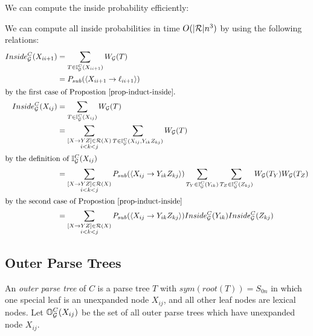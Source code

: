 \documentclass{article}
\newcommand\Inner{\mathbb{I}}
\newcommand\Outer{\mathbb{O}}
\begin{document}
We can compute the inside probability efficiently:

\begin{obs}
We can compute all inside probabilities in time $O(|{\mathcal R}|n^3)$ by using the
following relations:
  \begin{align*}
Inside_\GGG^C(X_{i i+1}) &= \sum_{T\in \Inner_\GGG^C(X_{i i+1})}
W_\GGG(T)\\
 &= P_{sub}(\langle X_{i i+1} \to \ell_{i i+1} \rangle) \\
\intertext{by the first case of Propostion \ref{prop-induct-inside}.}
Inside_\GGG^C(X_{ij}) &= \sum_{T\in \Inner_\GGG^C(X_{ij})} W_\GGG(T)\\
&= \sum_{\substack{[X\to YZ] \in \RRR(X)\\ i < k < j}} \sum_{T\in
  \Inner_\GGG^C(X_{ij}, Y_{ik}Z_{kj})} W_\GGG(T)\\
\intertext{by the definition of $\Inner_\GGG^C(X_{ij})$}
&= \sum_{\substack{[X\to YZ] \in \RRR(X)\\ i < k < j}} 
P_{sub}(\langle X_{ij} \to Y_{ik} Z_{kj} \rangle)
\sum_{T_Y\in \Inner_\GGG^C(Y_{ik})}
\sum_{T_Z\in \Inner_\GGG^C(Z_{kj})}
 W_\GGG(T_Y) W_\GGG(T_Z)\\
\intertext{by the second case of Propostion \ref{prop-induct-inside}}
&= \sum_{\substack{[X\to YZ] \in \RRR(X)\\ i < k < j}} 
P_{sub}(\langle  X_{ij} \to Y_{ik} Z_{kj} \rangle)
Inside_\GGG^C(Y_{ik})
Inside_\GGG^C(Z_{kj})
  \end{align*}
\end{obs}

\subsection{Outer Parse Trees}

\begin{defn}
  An \emph{outer parse tree} of $C$ is a parse tree $T$ with
  $sym(root(T)) = S_{0n}$ in which one special leaf is an unexpanded node
  $X_{ij}$, and all other leaf nodes are lexical nodes. Let
  $\Outer_\GGG^C(X_{ij})$ be the set of all outer parse trees which
  have unexpanded node $X_{ij}$.
\end{defn}
\end{document}
